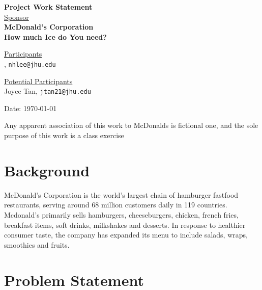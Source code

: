 \documentclass[12pt,letterpaper]{article}
\theoremstyle{definition}
\begin{document}
\def\shiftdowna{0.32in}  %
\def\shiftdownb{0.22in}  %


\begin{center}
\textbf{{\large Project Work Statement}}\\


\vspace \shiftdowna
\underline {Sponsor}\\ 
\vspace{5pt}
\textbf{{\large McDonald's Corporation}}\\


\vspace \shiftdowna
\textbf{{\large How much Ice do You need?}}


\vspace{0.35in}
\vspace \shiftdownb
\underline {Participants} \\
\vspace{5pt}
, \texttt{nhlee@jhu.edu}

\vspace \shiftdownb
\underline {Potential Participants}\\
\vspace{5pt}
Joyce Tan, \texttt{jtan21@jhu.edu} \\
\vspace{3pt}


\vspace \shiftdowna
Date: \today

\end{center}

\vfill  
\footnoterule
\noindent \small{Any apparent association of this work to McDonalds is
fictional one, and the sole purpose of this work is a class exercise}

\newpage

\section{Background} 
McDonald's Corporation is the world's largest chain of hamburger fastfood restaurants, serving around 68 million customers daily in 119 countries. Mcdonald's primarily sells hamburgers, cheeseburgers, chicken, french fries, breakfast items, soft drinks, milkshakes and desserts. In response to healthier consumer taste, the company has expanded its menu to include salads, wraps,
smoothies and fruits.

\section{Problem Statement}
\end{document}
